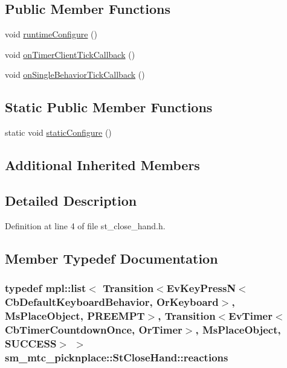 \subsection*{Public Member Functions}
\begin{DoxyCompactItemize}
\item 
void \hyperlink{structsm__mtc__picknplace_1_1StCloseHand_abb015ba0081082ac1e8252018a755584}{runtime\+Configure} ()
\item 
void \hyperlink{structsm__mtc__picknplace_1_1StCloseHand_a5004a0ed46cb01107fe023f25182c783}{on\+Timer\+Client\+Tick\+Callback} ()
\item 
void \hyperlink{structsm__mtc__picknplace_1_1StCloseHand_ac4e47f0cfad59899df44074b2e1865b4}{on\+Single\+Behavior\+Tick\+Callback} ()
\end{DoxyCompactItemize}
\subsection*{Static Public Member Functions}
\begin{DoxyCompactItemize}
\item 
static void \hyperlink{structsm__mtc__picknplace_1_1StCloseHand_aeeef9f8859b46404be94d594a4612f92}{static\+Configure} ()
\end{DoxyCompactItemize}
\subsection*{Additional Inherited Members}


\subsection{Detailed Description}


Definition at line 4 of file st\+\_\+close\+\_\+hand.\+h.



\subsection{Member Typedef Documentation}
\subsubsection[{\texorpdfstring{reactions}{reactions}}]{\setlength{\rightskip}{0pt plus 5cm}typedef mpl\+::list$<$ Transition$<$Ev\+Key\+PressN$<$Cb\+Default\+Keyboard\+Behavior, {\bf Or\+Keyboard}$>$, {\bf Ms\+Place\+Object}, {\bf P\+R\+E\+E\+M\+PT}$>$, Transition$<$Ev\+Timer$<$Cb\+Timer\+Countdown\+Once, {\bf Or\+Timer}$>$, {\bf Ms\+Place\+Object}, {\bf S\+U\+C\+C\+E\+SS}$>$ $>$ {\bf sm\+\_\+mtc\+\_\+picknplace\+::\+St\+Close\+Hand\+::reactions}}\hypertarget{structsm__mtc__picknplace_1_1StCloseHand_a741fc0fcb00a098b452255ec9eea56ae}{}\label{structsm__mtc__picknplace_1_1StCloseHand_a741fc0fcb00a098b452255ec9eea56ae}


